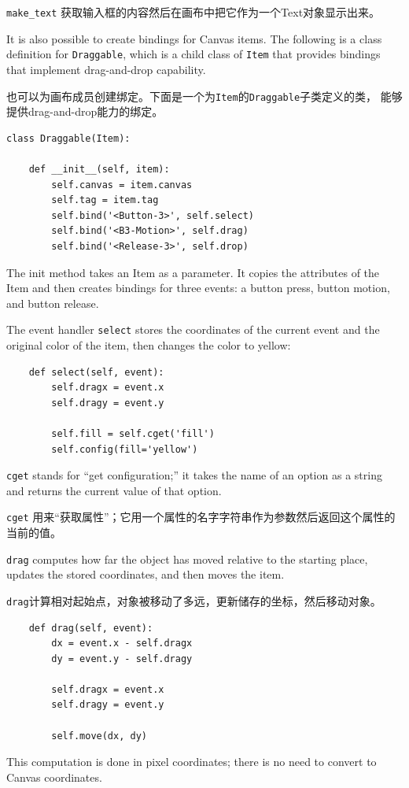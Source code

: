 \documentclass[10pt]{book}
\begin{document}
\begin{CJK}{UTF8}{gbsn}
\verb"make_text" 获取输入框的内容然后在画布中把它作为一个Text对象显示出来。

It is also possible to create bindings for Canvas items.
The following is a class definition for {\tt Draggable},
which is a child class of {\tt Item} that provides bindings
that implement drag-and-drop capability.

也可以为画布成员创建绑定。下面是一个为{\tt Item}的{\tt Draggable}子类定义的类，
能够提供drag-and-drop能力的绑定。

\begin{verbatim}
class Draggable(Item):

    def __init__(self, item):
        self.canvas = item.canvas
        self.tag = item.tag
        self.bind('<Button-3>', self.select)
        self.bind('<B3-Motion>', self.drag)
        self.bind('<Release-3>', self.drop)
\end{verbatim}
%
The init method takes an Item as a parameter.  It copies
the attributes of the Item and then creates bindings for
three events: a button press, button motion, and button release.

The event handler {\tt select} stores the coordinates
of the current event and the original color of the item, then
changes the color to yellow:

\begin{verbatim}
    def select(self, event):
        self.dragx = event.x
        self.dragy = event.y

        self.fill = self.cget('fill')
        self.config(fill='yellow')
\end{verbatim}
%
{\tt cget} stands for ``get configuration;'' it takes the name of an
option as a string and returns the current value of that option.

{\tt cget} 用来``获取属性''；它用一个属性的名字字符串作为参数然后返回这个属性的当前的值。

{\tt drag} computes how far the object has moved relative to the
starting place, updates the stored coordinates, and then moves the
item.

{\tt drag}计算相对起始点，对象被移动了多远，更新储存的坐标，然后移动对象。

\begin{verbatim}
    def drag(self, event):
        dx = event.x - self.dragx
        dy = event.y - self.dragy

        self.dragx = event.x
        self.dragy = event.y

        self.move(dx, dy)
\end{verbatim}
%
This computation is done in pixel coordinates; there is no need to
convert to Canvas coordinates.


\end{CJK}
\end{document}

